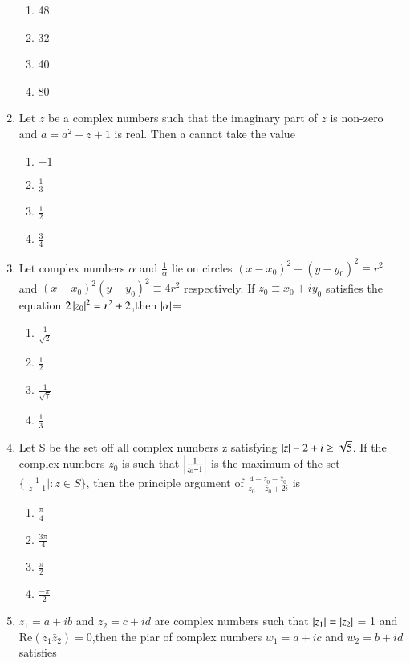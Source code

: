 \begin{enumerate}[label=\arabic*.,ref=\thesubsection.\theenumi]
    \begin{enumerate}
    \item 48
    \item 32
    \item 40
    \item 80
    \end{enumerate}    
    \item Let $z$ be a complex numbers such that the imaginary part of $z$ is non-zero and $a = a^2+z+1$ is real. Then a cannot take the value
    \begin{enumerate}        
    \item   $-1$ 
    \item   $\frac{1}{3}$
    \item   $\frac{1}{2}$
    \item   $\frac{3}{4}$
    \end{enumerate}
    \item Let complex numbers $\alpha$ and $\frac{1}{\alpha}$  lie on circles $(x-x_0)^2+(y-y_0)^2\equiv r^2$ and $(x-x_0)^2 (y-y_0)^2\equiv 4r^2$ respectively. If $z_0\equiv x_0+iy_0$ satisfies the equation $2\left\vert z_0\right\vert ^2 = r^2+2$,then $\left\vert\alpha\right\vert $=
    \begin{enumerate}
    \item    $\frac{1}{\sqrt 2}$ 
    \item   $\frac{1}{2}$
    \item   $\frac{1}{\sqrt7}$
    \item   $\frac{1}{3}$
    \end{enumerate}
    \item Let S be the set off all complex numbers z satisfying  $\left\vert z\right\vert-2+i \geq \sqrt 5$. If the complex numbers $z_0$ is such that ${\left\vert\frac{1}{z_0-1}\right\vert}$ is the maximum of the set $\{{\vert\frac{1}{z-1}\vert}:z\in S\}$, then the principle argument of $\frac{4-z_0-\bar z_0}{z_0-\bar z_0+2i}$ is 
    \begin{enumerate}
    \item    $\frac{\pi}{4}$ 
    \item   $\frac{3\pi}{4}$
    \item   $\frac{\pi}{2}$
    \item   $\frac{-\pi}{2}$ 
    \end{enumerate}
    \item $z_1 = a+ib$ and $z_2 = c+id$  are complex numbers such that $\left\vert z_1\right\vert = \left\vert z_2\right\vert$ = 1 and Re$(z_1 \bar z_2)=0$,then the piar of complex numbers $w_1=a+ic$ and $w_2=b+id$ satisfies 
    \begin{enumerate}

\end{enumerate}
\end{enumerate}
